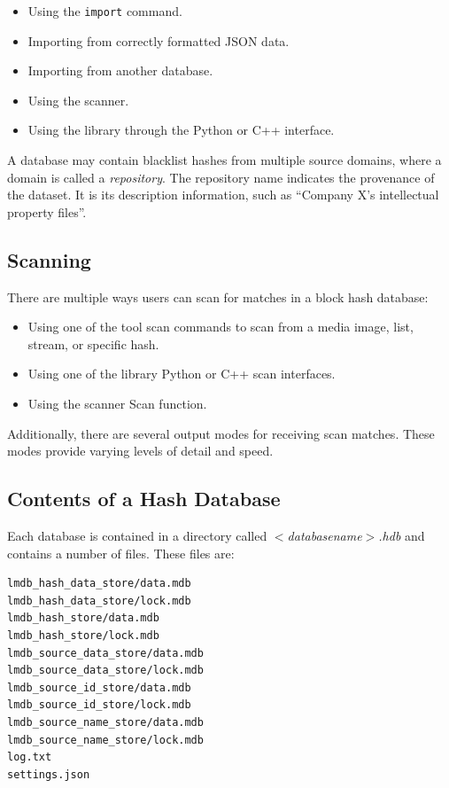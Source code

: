 \documentclass[11pt,fleqn]{article} %
\begin{document}
\begin{itemize}
\item Using the \hdb \verb+import+ command.
\item Importing from correctly formatted JSON data.
\item Importing from another database.
\item Using the \bulk \hdb scanner.
\item Using the \hdb library through the Python or C++ interface.
\end{itemize}

A database may contain blacklist hashes from multiple source domains,
where a domain is called a \textit{repository}.
The repository name indicates the provenance of the dataset.
It is its description information, such as ``Company X's intellectual property files''.\\

\subsection{Scanning}
There are multiple ways users can scan for matches in a block hash database:

\begin{itemize}
\item Using one of the \hdb tool scan commands to scan from a media image,
list, stream, or specific hash.
\item Using one of the \hdb library Python or C++ scan interfaces.
\item Using the \bulk \hdb scanner Scan function.
\end{itemize}

Additionally, there are several output modes for receiving scan matches. These modes provide varying levels of detail and speed.

\subsection{Contents of a Hash Database}
\label{ContentsOfDB}
Each \hdb database is contained in a directory called \textit{$<$databasename$>$.hdb} and contains a number of files. These files are:

\begingroup
\footnotesize
\begin{Verbatim}[fontfamily=courier]
lmdb_hash_data_store/data.mdb
lmdb_hash_data_store/lock.mdb
lmdb_hash_store/data.mdb
lmdb_hash_store/lock.mdb
lmdb_source_data_store/data.mdb
lmdb_source_data_store/lock.mdb
lmdb_source_id_store/data.mdb
lmdb_source_id_store/lock.mdb
lmdb_source_name_store/data.mdb
lmdb_source_name_store/lock.mdb
log.txt
settings.json
\end{Verbatim}
\endgroup
\end{document}

